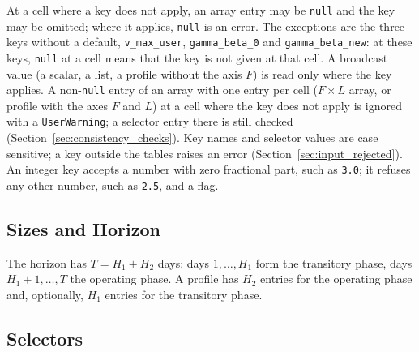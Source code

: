 At a cell where a key does not apply, an array entry may be \texttt{null} and the key may be omitted; where it applies, \texttt{null} is an error.
The exceptions are the three keys without a default, \texttt{v\_max\_user}, \texttt{gamma\_beta\_0} and \texttt{gamma\_beta\_new}: at these keys, \texttt{null} at a cell means that the key is not given at that cell.
A broadcast value (a scalar, a list, a profile without the axis $F$) is read only where the key applies.
A non-\texttt{null} entry of an array with one entry per cell ($F \times L$ array, or profile with the axes $F$ and $L$) at a cell where the key does not apply is ignored with a \texttt{UserWarning}; a selector entry there is still checked (Section~\ref{sec:consistency_checks}).
Key names and selector values are case sensitive; a key outside the tables raises an error (Section~\ref{sec:input_rejected}).
An integer key accepts a number with zero fractional part, such as \texttt{3.0}; it refuses any other number, such as \texttt{2.5}, and a flag.

\subsection{Sizes and Horizon}\label{sec:input_scalars}

\keytab
{}
\tabend

The horizon has $T = H_1 + H_2$ days: days $1,\ldots,H_1$ form the transitory phase, days $H_1+1,\ldots,T$ the operating phase.
A profile has $H_2$ entries for the operating phase and, optionally, $H_1$ entries for the transitory phase.

\subsection{Selectors}\label{sec:input_selectors}

